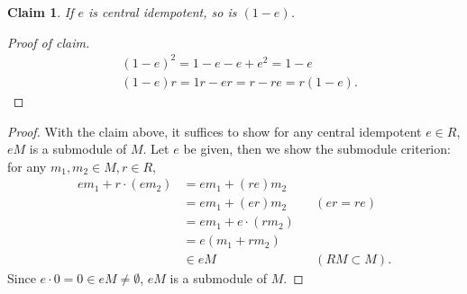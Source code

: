 \documentclass{article}
\title{\mytitle}
\author{\myname}
\date{\today}
\theoremstyle{plain}
\newtheorem*{claim*}{Claim}
\begin{document}
\maketitle
\section{}
\subsection{}
\subsubsection{}
\begin{claim*}
If $e$ is central idempotent, so is $(1-e)$.
\end{claim*}
\begin{proof}[Proof of claim]
  \begin{align*}
    &{(1-e)}^{2}=1-e-e+e^{2}=1-e\\
    &(1-e)r=1r-er=r-re=r(1-e).
  \end{align*}
\end{proof}
\begin{proof}
With the claim above, it suffices to show for any central idempotent $e\in R$,
$eM$ is a submodule of $M$. Let $e$ be given, then we show the submodule
criterion: for any $m_{1},m_{2}\in M, r\in R$,
\begin{align*}
  em_{1}+r\cdot(em_{2})
  &=em_{1}+(re)m_{2}\\
  &=em_{1}+(er)m_{2}&&(er=re)\\
  &=em_{1}+e\cdot(rm_{2})\\
  &=e(m_{1}+rm_{2})\\
  &\in eM&&(RM\subset M).
\end{align*}
Since $e\cdot0=0\in eM\ne\emptyset$, $eM$ is a submodule of $M$.
\end{proof}
\end{document}
